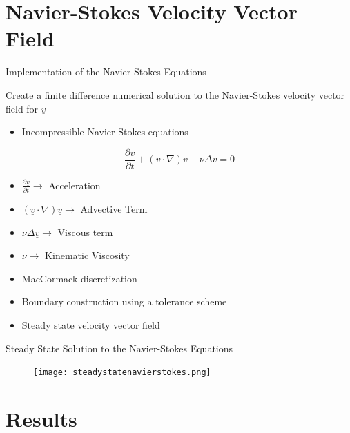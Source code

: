 \documentclass[10pt]{beamer}
\begin{document}
\section{Navier-Stokes Velocity Vector Field}
\begin{frame} {Implementation of the Navier-Stokes Equations}\label{NavierStokesSlide}

Create a finite difference numerical solution to the Navier-Stokes velocity vector field for $\underline{v}$

\begin{itemize}
\item Incompressible Navier-Stokes equations
\end{itemize}

\begin{equation}
\frac{\partial \underline{v}}{\partial t}+\left(\underline{v}\cdot \nabla \right)\underline{v}-\nu \Delta \underline{v} = \underline{0}
\end{equation}

\begin{itemize}
\item $\frac{\partial \underline{v}}{\partial t} \rightarrow$ Acceleration
\item $\left(\underline{v}\cdot \nabla \right)\underline{v} \rightarrow$ Advective Term
\item $\nu \Delta \underline{v} \rightarrow$ Viscous term
\item $\nu \rightarrow$ Kinematic Viscosity
\item MacCormack discretization
\item Boundary construction using a tolerance scheme
\item Steady state velocity vector field
\end{itemize}
\hyperlink{Questions}{}
\end{frame}

\begin{frame} {Steady State Solution to the Navier-Stokes Equations} \label{NavierStokesSteadyState}

\begin{figure}
\centering   
   \texttt{[image: steadystatenavierstokes.png]}
   
\end{figure}
\hyperlink{Questions}{}
\end{frame}



\section{Results}
\end{document}
